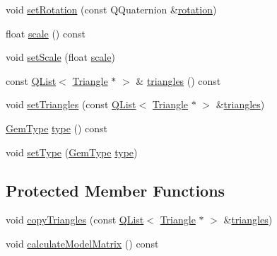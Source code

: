 \begin{DoxyCompactItemize}
\item 
void \hyperlink{class_gem_data_ac22fb4a6faf13d78299be0f5cfd029a1}{set\+Rotation} (const Q\+Quaternion \&\hyperlink{class_gem_data_a3c902384912903b22d5eaab7e70f1f5c}{rotation})
\item 
float \hyperlink{class_gem_data_a39ef099801a421c7b7ffbbd920084eb0}{scale} () const 
\item 
void \hyperlink{class_gem_data_a49e18ed27815f66469f4ac951b5f969b}{set\+Scale} (float \hyperlink{class_gem_data_a39ef099801a421c7b7ffbbd920084eb0}{scale})
\item 
const \hyperlink{class_q_list}{Q\+List}$<$ \hyperlink{class_triangle}{Triangle} $\ast$ $>$ \& \hyperlink{class_gem_data_a2c8956630fdf362efe4e69db9bad2f7f}{triangles} () const 
\item 
void \hyperlink{class_gem_data_aa4be4b2b96ae412308c89e053249d744}{set\+Triangles} (const \hyperlink{class_q_list}{Q\+List}$<$ \hyperlink{class_triangle}{Triangle} $\ast$ $>$ \&\hyperlink{class_gem_data_a2c8956630fdf362efe4e69db9bad2f7f}{triangles})
\item 
\hyperlink{abstractgem_8h_a2f0a34b6dac35a9610cab7a1c5fcb444}{Gem\+Type} \hyperlink{class_gem_data_a38e33b0c64c37f30d0e063580d6a20bb}{type} () const 
\item 
void \hyperlink{class_gem_data_a10d94a0bd72a57fb9a52a8f534f3e1dd}{set\+Type} (\hyperlink{abstractgem_8h_a2f0a34b6dac35a9610cab7a1c5fcb444}{Gem\+Type} \hyperlink{class_gem_data_a38e33b0c64c37f30d0e063580d6a20bb}{type})
\end{DoxyCompactItemize}
\subsection*{Protected Member Functions}
\begin{DoxyCompactItemize}
\item 
void \hyperlink{class_gem_data_a24986c8eaaa23640a7cb7fff9f4df2b5}{copy\+Triangles} (const \hyperlink{class_q_list}{Q\+List}$<$ \hyperlink{class_triangle}{Triangle} $\ast$ $>$ \&\hyperlink{class_gem_data_a2c8956630fdf362efe4e69db9bad2f7f}{triangles})
\item 
void \hyperlink{class_gem_data_ac558e3bbb71c2ec73400f0a0cb309693}{calculate\+Model\+Matrix} () const 
\end{DoxyCompactItemize}
